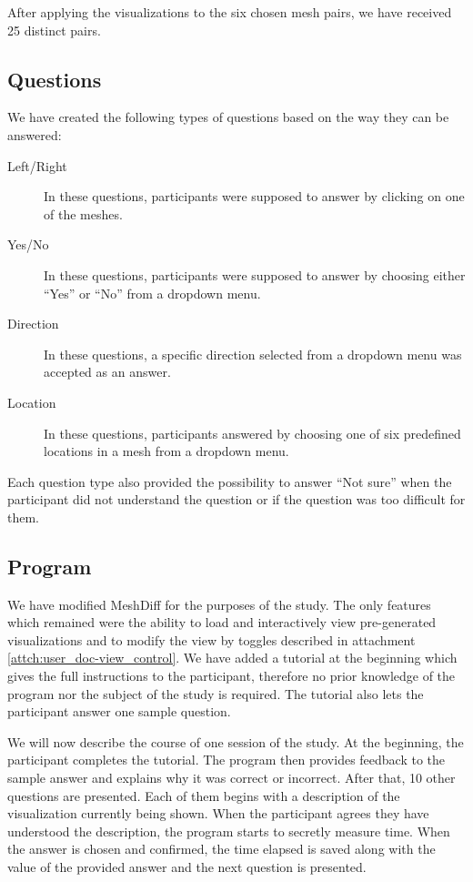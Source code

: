 After applying the visualizations to the six chosen mesh pairs, we have received 25 distinct pairs.

\subsection{Questions}
\label{subsec:user_study-setting-question}

We have created the following types of questions based on the way they can be answered:

\begin{description}
\item [Left/Right] In these questions, participants were supposed to answer by clicking on one of the meshes.
\item [Yes/No] In these questions, participants were supposed to answer by choosing either ``Yes'' or ``No'' from a dropdown menu.
\item [Direction] In these questions, a specific direction selected from a dropdown menu was accepted as an answer.
\item [Location] In these questions, participants answered by choosing one of six predefined locations in a mesh from a dropdown menu.
\end{description}

Each question type also provided the possibility to answer ``Not sure'' when the participant did not understand the question or if the question was too difficult for them.

\subsection{Program}
\label{subsec:user_study-setting-program}

We have modified MeshDiff for the purposes of the study. The only features which remained were the ability to load and interactively view pre-generated visualizations and to modify the view by toggles described in attachment \ref{attch:user_doc-view_control}. We have added a tutorial at the beginning which gives the full instructions to the participant, therefore no prior knowledge of the program nor the subject of the study is required. The tutorial also lets the participant answer one sample question. 

We will now describe the course of one session of the study. At the beginning, the participant completes the tutorial. The program then provides feedback to the sample answer and explains why it was correct or incorrect. After that, 10 other questions are presented. Each of them begins with a description of the visualization currently being shown. When the participant agrees they have understood the description, the program starts to secretly measure time. When the answer is chosen and confirmed, the time elapsed is saved along with the value of the provided answer and the next question is presented.

